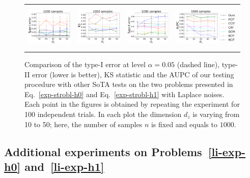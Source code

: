 \begin{figure}[ht]
\begin{tabular}{cccc} 
\includegraphics[height=2.2cm]{sections/appendix/independence_testing_kernel/figures_strobl_highdim_lap/nsamples_fixed_1000_strobl_dim_10_50_typeI.pdf}& \includegraphics[height=2.2cm]{sections/appendix/independence_testing_kernel/figures_strobl_highdim_lap/nsamples_fixed_1000_strobl_dim_10_50_ks.pdf} & 
\includegraphics[height=2.2cm]{sections/appendix/independence_testing_kernel/figures_strobl_highdim_lap/nsamples_fixed_1000_strobl_dim_10_50_typeII.pdf}& \includegraphics[height=2.2cm]{sections/appendix/independence_testing_kernel/figures_strobl_highdim_lap/nsamples_fixed_1000_strobl_dim_10_50_aupc.pdf}
\end{tabular}
\caption{Comparison of the type-I error at level $\alpha=0.05$ (dashed line), type-II error (lower is better), KS statistic and the AUPC of our testing procedure with other SoTA tests on the two problems presented in Eq.~\eqref{exp-strobl-h0} and Eq.~\eqref{exp-strobl-h1} with Laplace noises. Each point in the figures is obtained by repeating the experiment for 100 independent trials. In each plot the dimension $d_z$ is varying from 10 to 50; here, the number of samples $n$ is fixed and equals to $1000$.
\label{fig-exp-strobl-highdim-laplace-supp}}
\vspace{-0.8cm}
\end{figure}


\newpage
\subsection{Additional experiments on Problems~\eqref{li-exp-h0} and~\eqref{li-exp-h1}}
\label{sec-exp-li}
\vspace{-0.2cm}
